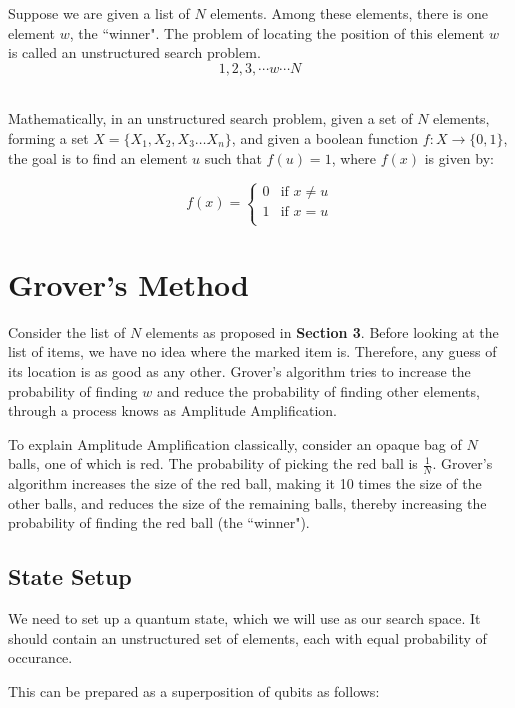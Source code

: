 \documentclass[a4paper]{article}
\begin{document}
Suppose we are given a list of $N$ elements. Among these elements, there is one
element $w$, the ``winner". The problem of locating the position of this element
$w$ is called an unstructured search problem.  $$ 1, 2, 3, \cdots w \cdots N $$
\\ \par

Mathematically, in an unstructured search problem, given a set of $N$ elements,
forming a set $X = \{X_1, X_2, X_3 \ldots X_n\} $, and given a boolean function
$f: X \to \{0, 1\}$, the goal is to find an element $u$ such that $f(u) = 1$,
where $f(x)$ is given by:

\[
    f(x) = \left\{
        \begin{array}{ll}
            0 & \mbox{if } x \neq u \\
            1 & \mbox{if } x = u \\
        \end{array}
        \right.
\]

\pagebreak


\section{ Grover's Method }
Consider the list of $N$ elements as proposed in \textbf{Section 3}. Before
looking at the list of items, we have no idea where the marked item is.
Therefore, any guess of its location is as good as any other. Grover's algorithm
tries to increase the probability of finding $w$ and reduce the probability of 
finding other elements, through a process knows as Amplitude Amplification.
\\
\par

To explain Amplitude Amplification classically, consider an opaque bag of $N$
balls, one of which is red. The probability of picking the red ball is
$\frac{1}{N}$.  Grover's algorithm increases the size of the red ball, making
it 10 times the size of the other balls, and reduces the size of the remaining
balls, thereby increasing the probability of finding the red ball (the ``winner").
\\
\par

\subsection{ State Setup }
We need to set up a quantum state, which we will use as our search space. It should 
contain an unstructured set of elements, each with equal probability of occurance. 
\\
\par
This can be prepared as a superposition of qubits as follows:
\end{document}
